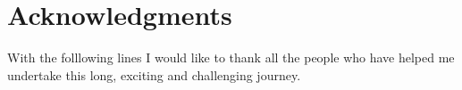 \cleardoublepage
\chapter*{Acknowledgments}
\thispagestyle{simple} %


With the folllowing lines I would like to thank all the people who have helped me undertake this long, exciting and challenging journey.